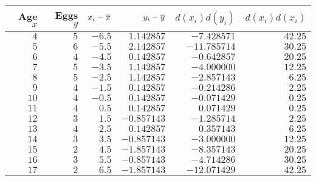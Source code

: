 \begin{tabular}{rrrrrr}                                                               \toprule
Age $x$ & Eggs $y$ & $x_i - \overline{x}$ & $y_i - \overline{y}$ & $d(x_i)d(y_i)$ & $d(x_i)d(x_i)$ \\\midrule
$4$     & $5$      & $-6.5$        & $1.142857$    & $-7.428571$   & $42.25$        \\
$5$     & $6$      & $-5.5$        & $2.142857$    & $-11.785714$  & $30.25$        \\
$6$     & $4$      & $-4.5$        & $0.142857$    & $-0.642857$   & $20.25$        \\
$7$     & $5$      & $-3.5$        & $1.142857$    & $-4.000000$   & $12.25$        \\
$8$     & $5$      & $-2.5$        & $1.142857$    & $-2.857143$   & $6.25$         \\
$9$     & $4$      & $-1.5$        & $0.142857$    & $-0.214286$   & $2.25$         \\
$10$    & $4$      & $-0.5$        & $0.142857$    & $-0.071429$   & $0.25$         \\
$11$    & $4$      & $0.5$         & $0.142857$    & $0.071429$    & $0.25$         \\
$12$    & $3$      & $1.5$         & $-0.857143$   & $-1.285714$   & $2.25$         \\
$13$    & $4$      & $2.5$         & $0.142857$    & $0.357143$    & $6.25$         \\
$14$    & $3$      & $3.5$         & $-0.857143$   & $-3.000000$   & $12.25$        \\
$15$    & $2$      & $4.5$         & $-1.857143$   & $-8.357143$   & $20.25$        \\
$16$    & $3$      & $5.5$         & $-0.857143$   & $-4.714286$   & $30.25$        \\
$17$    & $2$      & $6.5$         & $-1.857143$   & $-12.071429$  & $42.25$        \\\bottomrule
\end{tabular}
